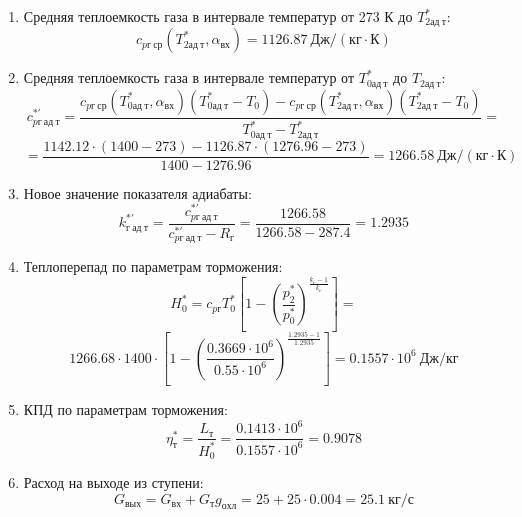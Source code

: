 \documentclass[a4paper,10pt]{article}
\begin{document}
\begin{enumerate}
        \item Средняя теплоемкость газа в интервале температур от 273 К до $T_{2ад\ т}^*$:
        \[
            c_{pг\ ср} (T_{2ад\ т}^*, \alpha_{вх}) =
            1126.87 \ Дж/(кг \cdot К)
        \]

        \item Средняя теплоемкость газа в интервале температур от $T_{0ад\ т}^*$ до $T_{2ад\ т}$:
        \[
            c_{pг\ ад\ т}^{*\prime} = \frac{
		        c_{pг\ ср}(T_{0ад\ т}^*, \alpha_{вх}) (T_{0ад\ т}^* - T_0) - c_{pг\ ср}(T_{2ад\ т}^*, \alpha_{вх}) (T_{2ад\ т}^* - T_0)
		    }{
		        T_{0ад\ т}^* - T_{2ад\ т}^*} =\]
        \[    =\frac{
		        1142.12 \cdot
                (1400 - 273) -
		        1126.87 \cdot
                (1276.96 - 273)
		    }{
		        1400 - 1276.96} =
		    1266.58 \ Дж / (кг \cdot К)
        \]

        \item Новое значение показателя адиабаты:
        \[
            k_{г\ ад\ т}^{*\prime} = \frac{c_{pг\ ад\ т}^{*\prime}}{c_{pг\ ад\ т}^{*\prime} - R_г} =
                \frac{
                    1266.58
                }{
                    1266.58 - 287.4
                }
            = 1.2935
        \]

        \item Теплоперепад по параметрам торможения:
        \[
            H_0^* = c_{pг} T_0^* \left[
                        1 - \left(
                                \frac{p_2^*}{p_0^*}
                            \right) ^
                        \frac{k_г - 1}{k_г}
                    \right] =\]
        \[    1266.68 \cdot 1400 \cdot
                    \left[
                        1 - \left(
                                \frac{
                                    0.3669 \cdot 10^6
                                }{
                                    0.55 \cdot 10^6
                                }
                            \right) ^
                        \frac{1.2935 - 1}{1.2935}
                    \right]
            = 0.1557 \cdot 10^6 \ Дж/кг
        \]

        \item КПД по параметрам торможения:
        \[
            \eta_т^* = \frac{ L_т }{ H_0^* } =
                \frac{
                    0.1413 \cdot 10^6
                }{
                    0.1557 \cdot 10^6 } =
            0.9078
        \]

        \item Расход на выходе из ступени:
        \[
            G_{вых} = G_{вх} + G_т g_{охл} =
                25 + 25 \cdot
                0.004 =
            25.1 \ кг/с
        \]


\end{enumerate}
\end{document}
